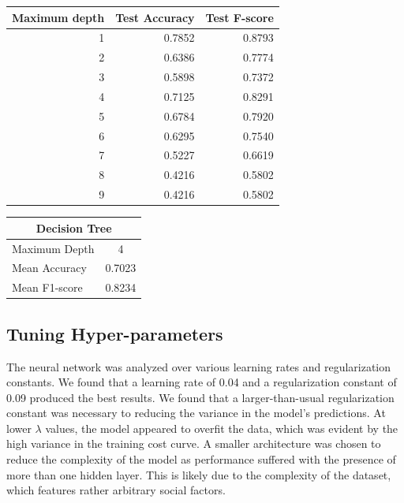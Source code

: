 \documentclass{article}
\begin{document}
\begin{minipage}{0.49\textwidth}
    \centering
    \begin{tabular}{rrr}
        \toprule
        Maximum depth & Test Accuracy & Test F-score \\
        \midrule
        1 & {0.7852} & {0.8793} \\
        2 & {0.6386} & {0.7774} \\
        3 & {0.5898} & {0.7372} \\
        4 & {0.7125} & {0.8291} \\
        5 & {0.6784} & {0.7920} \\
        6 & {0.6295} & {0.7540} \\
        7 & {0.5227} & {0.6619} \\
        8 & {0.4216} & {0.5802} \\
        9 & {0.4216} & {0.5802} \\
        \bottomrule
    \end{tabular}


    \vspace*{30pt}
    \begin{tabular}{lc}
        \toprule
        \multicolumn{2}{c}{Decision Tree} \\
        \midrule
        Maximum Depth & 4 \\
        Mean Accuracy & 0.7023 \\
        Mean F1-score & 0.8234 \\
        \bottomrule
    \end{tabular}
\end{minipage}
\restoregeometry
\subsection*{Tuning Hyper-parameters}

The neural network was analyzed over various learning rates and regularization constants. We found that a learning rate of 0.04 and a regularization constant of 0.09 produced the best results.
We found that a larger-than-usual regularization constant was necessary to reducing the variance in the model's predictions. At lower $\lambda$ values, the model appeared to overfit the data, which was evident by the high variance in the training cost curve.
A smaller architecture was chosen to reduce the complexity of the model as performance suffered with the presence of more than one hidden layer.
This is likely due to the complexity of the dataset, which features rather arbitrary social factors.
\\
\end{document}
